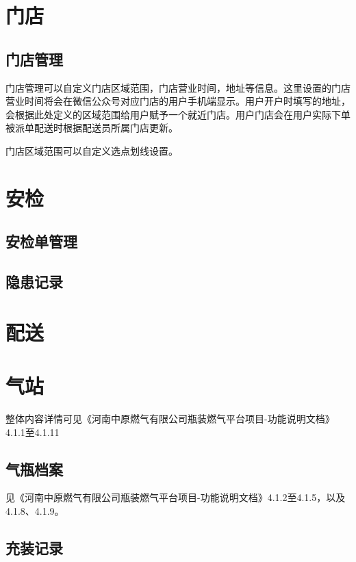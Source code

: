 \documentclass[UTF8]{ctexart}
\begin{document}
\section{门店}

\subsection{门店管理}

门店管理可以自定义门店区域范围，门店营业时间，地址等信息。这里设置的门店营业时间将会在微信公众号对应门店的用户手机端显示。用户开户时填写的地址，会根据此处定义的区域范围给用户赋予一个就近门店。用户门店会在用户实际下单被派单配送时根据配送员所属门店更新。


门店区域范围可以自定义选点划线设置。



\section{安检}

\subsection{安检单管理}

\subsection{隐患记录}


\section{配送}


\section{气站}

整体内容详情可见《河南中原燃气有限公司瓶装燃气平台项目-功能说明文档》4.1.1至4.1.11

\subsection{气瓶档案}

见《河南中原燃气有限公司瓶装燃气平台项目-功能说明文档》4.1.2至4.1.5，以及4.1.8、4.1.9。

\subsection{充装记录}
\end{document}
